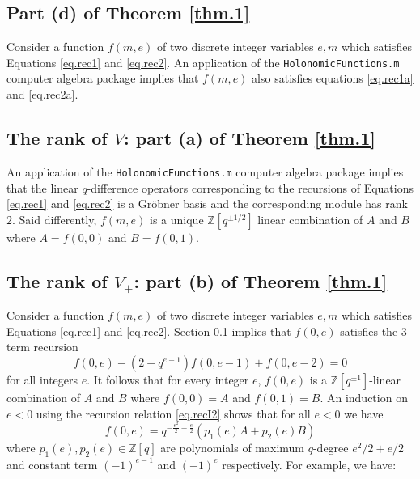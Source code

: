 \documentclass[12pt]{amsart}
\theoremstyle{definition}
\def\BZ{\mathbb Z}
\def\be{  \begin{equation} }
\def\ee{  \end{equation} }
\numberwithin{equation}{section}
\begin{document}
\subsection{Part (d) of Theorem \ref{thm.1}}
\label{sub.partd}

Consider a function $f(m,e)$ of two discrete integer 
variables $e,m$ which satisfies Equations
\eqref{eq.rec1} and \ref{eq.rec2}. An application of the 
{\tt HolonomicFunctions.m} computer algebra package \cite{Kou} implies that
$f(m,e)$ also satisfies equations \eqref{eq.rec1a} and \eqref{eq.rec2a}.

\subsection{The rank of $V$:  part (a) of Theorem \ref{thm.1}}
\label{sub.rankV}

An application of the {\tt HolonomicFunctions.m} computer algebra package 
\cite{Kou} implies that the linear $q$-difference operators corresponding 
to the recursions of Equations \eqref{eq.rec1} and \eqref{eq.rec2}
is a Gr\"obner basis and the corresponding module has rank $2$. Said
differently, $f(m,e)$ is a unique $\BZ[q^{\pm 1/2}]$ linear combination of 
$A$ and $B$ where $A=f(0,0)$ and $B=f(0,1)$.


\subsection{The rank of $V_+$:  part (b) of Theorem \ref{thm.1}}
\label{sub.rankV+}

Consider a function $f(m,e)$ of two discrete integer 
variables $e,m$ which satisfies Equations
\eqref{eq.rec1} and \ref{eq.rec2}. Section \ref{sub.partd} implies 
that $f(0,e)$ satisfies the 3-term recursion
\be
\label{eq.recI2}
f(0, e) - (2 - q^{e-1}) f(0, e - 1) + f(0, e - 2)=0
\ee
for all integers $e$. It follows that for every integer $e$,
$f(0,e)$ is a $\BZ[q^{\pm 1}]$-linear combination of $A$ and $B$ where
$f(0,0)=A$ and $f(0,1)=B$. An induction on $e<0$ using the recursion 
relation \eqref{eq.recI2} shows that for all $e<0$ we have
$$
f(0,e) = q^{-\frac{e^2}{2}-\frac{e}{2}} \left( p_1(e) A + p_2(e) B \right)
$$
where $p_1(e), p_2(e) \in \BZ[q]$ are polynomials of maximum $q$-degree 
$e^2/2+e/2$ and constant term $(-1)^{e-1}$ and $(-1)^e$ respectively.
For example, we have:
\end{document}
